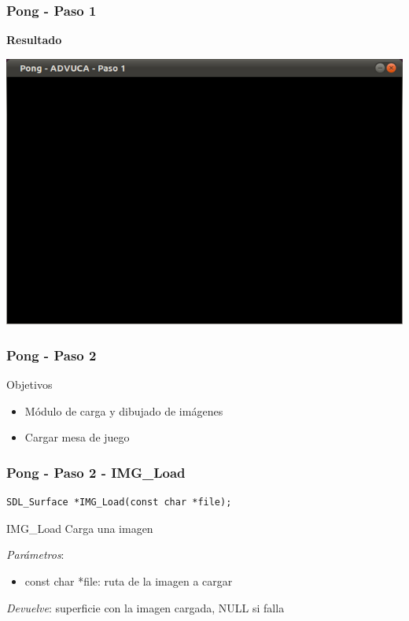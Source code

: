 \begin{frame}
	\frametitle{Pong - Paso 1}
	
    \begin{center}
        \textbf{Resultado}
    \end{center}
	
    \begin{center}
		\includegraphics[scale=0.4]{img/pong-advuca-1.png}
    \end{center}	

\end{frame}

\begin{frame}
	\frametitle{Pong - Paso 2}
	
	\begin{block}{Objetivos}
		\begin{itemize}
			\item Módulo de carga y dibujado de imágenes
			\item Cargar mesa de juego
		\end{itemize}            
	\end{block}

\end{frame}

\begin{frame}[fragile]
    \frametitle{Pong - Paso 2 - IMG\_Load}
	
\begin{verbatim}
SDL_Surface *IMG_Load(const char *file);
\end{verbatim}

    \begin{block}{IMG\_Load}
	Carga una imagen
	
	\emph{Parámetros}:
	\begin{itemize}
	    \item const char *file: ruta de la imagen a cargar
	\end{itemize}
	
	\emph{Devuelve}: superficie con la imagen cargada, NULL si falla
    \end{block}

\end{frame}

